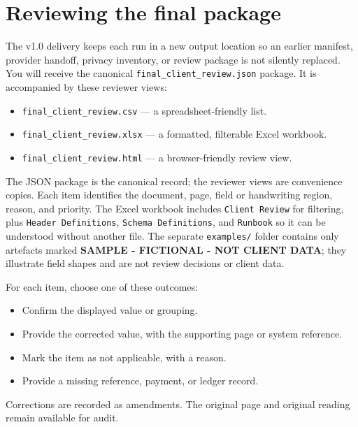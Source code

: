 \documentclass[
]{article}
\providecommand{\tightlist}{%
  \setlength{\itemsep}{0pt}\setlength{\parskip}{0pt}}
\begin{document}
\section{Reviewing the final package}\label{reviewing-the-final-package}

The v1.0 delivery keeps each run in a new output location so an earlier
manifest, provider handoff, privacy inventory, or review package is not
silently replaced. You will receive the canonical
\texttt{final\_\allowbreak{}client\_\allowbreak{}review.json} package.
It is accompanied by these reviewer views:

\begin{itemize}
\tightlist
\item
  \texttt{final\_\allowbreak{}client\_\allowbreak{}review.csv} --- a
  spreadsheet-friendly list.
\item
  \texttt{final\_\allowbreak{}client\_\allowbreak{}review.xlsx} --- a
  formatted, filterable Excel workbook.
\item
  \texttt{final\_\allowbreak{}client\_\allowbreak{}review.html} --- a
  browser-friendly review view.
\end{itemize}

The JSON package is the canonical record; the reviewer views are
convenience copies. Each item identifies the document, page, field or
handwriting region, reason, and priority. The Excel workbook includes
\texttt{Client\ Review} for filtering, plus
\texttt{Header\ Definitions}, \texttt{Schema\ Definitions}, and
\texttt{Runbook} so it can be understood without another file. The
separate \texttt{examples/\allowbreak{}} folder contains only artefacts
marked \textbf{SAMPLE - FICTIONAL - NOT CLIENT DATA}; they illustrate
field shapes and are not review decisions or client data.

For each item, choose one of these outcomes:

\begin{itemize}
\tightlist
\item
  Confirm the displayed value or grouping.
\item
  Provide the corrected value, with the supporting page or system
  reference.
\item
  Mark the item as not applicable, with a reason.
\item
  Provide a missing reference, payment, or ledger record.
\end{itemize}

Corrections are recorded as amendments. The original page and original
reading remain available for audit.
\end{document}
